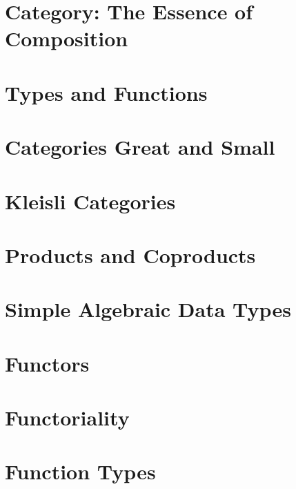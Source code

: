 \chapter{Category: The Essence of Composition}\label{category-the-essence-of-composition}


\chapter{Types and Functions}\label{types-and-functions}


\chapter{Categories Great and Small}\label{categories-great-and-small}


\chapter{Kleisli Categories}\label{kleisli-categories-page}


\chapter{Products and Coproducts}\label{products-and-coproducts}


\chapter{Simple Algebraic Data Types}\label{simple-algebraic-data-types}


\chapter{Functors}\label{chap-functors}


\chapter{Functoriality}\label{functoriality}


\chapter{Function Types}\label{function-types}


